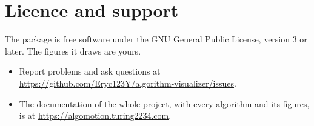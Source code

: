 \documentclass[11pt]{article}
\begin{document}
\section{Licence and support}

The package is free software under the GNU General Public License, version 3
or later. The figures it draws are yours.

\begin{itemize}
  \item Report problems and ask questions at\\
    \url{https://github.com/Eryc123Y/algorithm-visualizer/issues}.
  \item The documentation of the whole project, with every algorithm and its
    figures, is at \url{https://algomotion.turing2234.com}.
\end{itemize}
\end{document}
